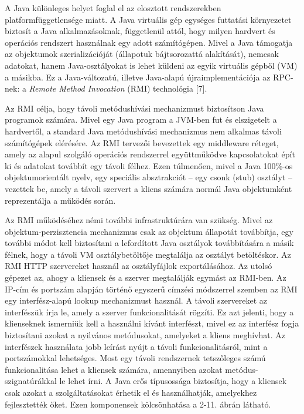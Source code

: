 \documentclass[
]{article}
\begin{document}
A Java különleges helyet foglal el az elosztott rendszerekben
platformfüggetlensége miatt. A Java virtuális gép egységes futtatási
környezetet biztosít a Java alkalmazásoknak, függetlenül attól, hogy
milyen hardvert és operációs rendszert használnak egy adott
számítógépen. Mivel a Java támogatja az objektumok szerializációját
(állapotuk bájtsorozattá alakítását), nemcsak adatokat, hanem
Java-osztályokat is lehet küldeni az egyik virtuális gépből (VM) a
másikba. Ez a Java-változatú, illetve Java-alapú újraimplementációja az
RPC-nek: a \emph{Remote Method Invocation} (RMI) technológia {[}7{]}.

Az RMI célja, hogy távoli metódushívási mechanizmust biztosítson Java
programok számára. Mivel egy Java program a JVM-ben fut és elszigetelt a
hardvertől, a standard Java metódushívási mechanizmus nem alkalmas
távoli számítógépek elérésére. Az RMI tervezői bevezettek egy middleware
réteget, amely az alapul szolgáló operációs rendszerrel együttműködve
kapcsolatokat épít ki és adatokat továbbít egy távoli félhez. Ezen
túlmenően, mivel a Java 100\%-os objektumorientált nyelv, egy speciális
absztrakciót -- egy csonk (stub) osztályt -- vezettek be, amely a távoli
szervert a kliens számára normál Java objektumként reprezentálja a
működés során.

Az RMI működéséhez némi további infrastruktúrára van szükség. Mivel az
objektum-perzisztencia mechanizmus csak az objektum állapotát
továbbítja, egy további módot kell biztosítani a lefordított Java
osztályok továbbítására a másik félnek, hogy a távoli VM
osztálybetöltője megtalálja az osztályt betöltéskor. Az RMI HTTP
szervereket használ az osztályfájlok exportálásához. Az utolsó gépezet
az, ahogy a kliensek és a szerver megtalálják egymást az RMI-ben. Az
IP-cím és portszám alapján történő egyszerű címzési módszerrel szemben
az RMI egy interfész-alapú lookup mechanizmust használ. A távoli
szervereket az interfészük írja le, amely a szerver funkcionalitását
rögzíti. Ez azt jelenti, hogy a klienseknek ismerniük kell a használni
kívánt interfészt, mivel ez az interfész fogja biztosítani azokat a
nyilvános metódusokat, amelyeket a kliens meghívhat. Az interfészek
használata jobb leírást nyújt a távoli funkcionalitásról, mint a
portszámokkal lehetséges. Most egy távoli rendszernek tetszőleges számú
funkcionalitása lehet a kliensek számára, amennyiben azokat
metódus-szignatúrákkal le lehet írni. A Java erős típusossága
biztosítja, hogy a kliensek csak azokat a szolgáltatásokat érhetik el és
használhatják, amelyekhez fejlesztették őket. Ezen komponensek
kölcsönhatása a 2-11. ábrán látható.
\end{document}
